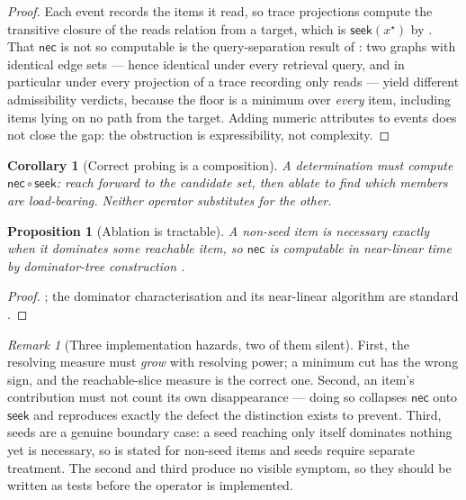 \documentclass[twocolumn,11pt,a4paper]{article}
\theoremstyle{sup}
\newtheorem{proposition}[theorem]{Proposition}
\newtheorem{corollary}[theorem]{Corollary}
\theoremstyle{definition}
\theoremstyle{remark}
\newtheorem{remark}[theorem]{Remark}
\newcommand{\seek}{\mathsf{seek}}
\newcommand{\nec}{\mathsf{nec}}
\begin{document}
\begin{proof}
Each event records the items it read, so trace projections compute the
transitive closure of the reads relation from a target, which is
$\seek(x^\star)$ by . That $\nec$ is not so
computable is the query-separation result of
\citet[\S15]{sachikonye2025directional}: two graphs with identical edge
sets --- hence identical under every retrieval query, and in particular under
every projection of a trace recording only reads --- yield different
admissibility verdicts, because the floor is a minimum over \emph{every} item,
including items lying on no path from the target. Adding numeric attributes to
events does not close the gap: the obstruction is expressibility, not
complexity.
\end{proof}

\begin{corollary}[Correct probing is a composition]
\label{cor:nec-seek}
A determination must compute $\nec\circ\seek$: reach forward to the candidate
set, then ablate to find which members are load-bearing. Neither operator
substitutes for the other.
\end{corollary}

\begin{proposition}[Ablation is tractable]
\label{prop:domination-srg}
A non-seed item is necessary exactly when it dominates some reachable item, so
$\nec$ is computable in near-linear time by dominator-tree construction
\citep{lengauer1979}.
\end{proposition}

\begin{proof}
\citet[\S13.5]{sachikonye2025directional}; the dominator characterisation and
its near-linear algorithm are standard \citep{lengauer1979,cooper2001}.
\end{proof}

\begin{remark}[Three implementation hazards, two of them silent]
\label{rem:hazards}
First, the resolving measure must \emph{grow} with resolving power; a minimum
cut has the wrong sign, and the reachable-slice measure is the correct one.
Second, an item's contribution must not count its own disappearance --- doing
so collapses $\nec$ onto $\seek$ and reproduces exactly the defect the
distinction exists to prevent. Third, seeds are a genuine boundary case: a seed
reaching only itself dominates nothing yet is necessary, so
 is stated for non-seed items and seeds require
separate treatment. The second and third produce no visible symptom, so they
should be written as tests before the operator is implemented.
\end{remark}
\end{document}
